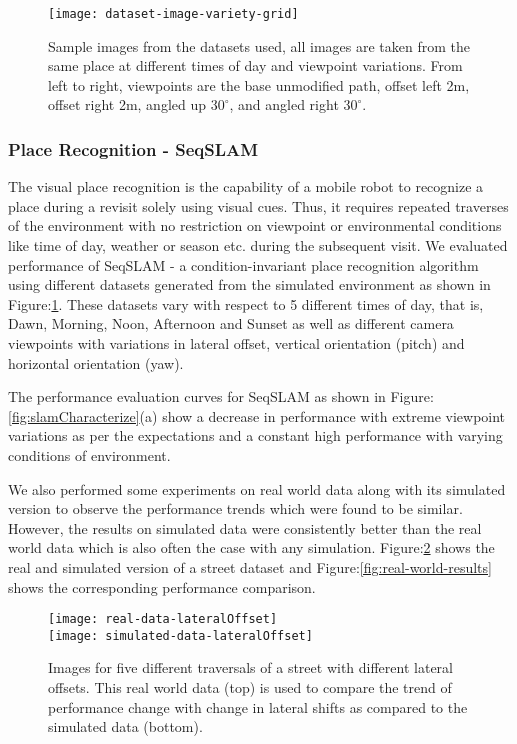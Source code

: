 \documentclass{article}
\begin{document}
\begin{figure}
 \centering
 \texttt{[image: dataset-image-variety-grid]}
 \caption{Sample images from the datasets used, all images are taken from the same place at different times of day and viewpoint variations. From left to right, viewpoints are the base unmodified path, offset left 2m, offset right 2m, angled up $30^{\circ}$, and angled right $30^{\circ}$.}
 \label{fig:simulatedDataImageGrid}
\end{figure}


\subsubsection{Place Recognition - SeqSLAM}
The visual place recognition is the capability of a mobile robot to recognize a place during a revisit solely using visual cues. Thus, it requires repeated traverses of the environment with no restriction on viewpoint or environmental conditions like time of day, weather or season etc. during the subsequent visit. We evaluated performance of SeqSLAM - a condition-invariant place recognition algorithm using different datasets generated from the simulated environment as shown in Figure:\ref{fig:simulatedDataImageGrid}. These datasets vary with respect to 5 different times of day, that is, Dawn, Morning, Noon, Afternoon and Sunset as well as different camera viewpoints with variations in lateral offset, vertical orientation (pitch) and horizontal orientation (yaw). 

The performance evaluation curves for SeqSLAM as shown in Figure:\ref{fig:slamCharacterize}(a) show a decrease in performance with extreme viewpoint variations as per the expectations and a constant high performance with varying conditions of environment. 

We also performed some experiments on real world data along with its simulated version to observe the performance trends which were found to be similar. However, the results on simulated data were consistently better than the real world data which is also often the case with any simulation. Figure:\ref{fig:realVsSim} shows the real and simulated version of a street dataset and Figure:\ref{fig:real-world-results} shows the corresponding performance comparison.

\begin{figure}
\centering
  \texttt{[image: real-data-lateralOffset]}\\
  \texttt{[image: simulated-data-lateralOffset]}\\
  
  \caption{Images for five different traversals of a street with different lateral offsets. This real world data (top) is used to compare the trend of performance change with change in lateral shifts as compared to the simulated data (bottom).}
  \label{fig:realVsSim}
\end{figure}
\end{document}
